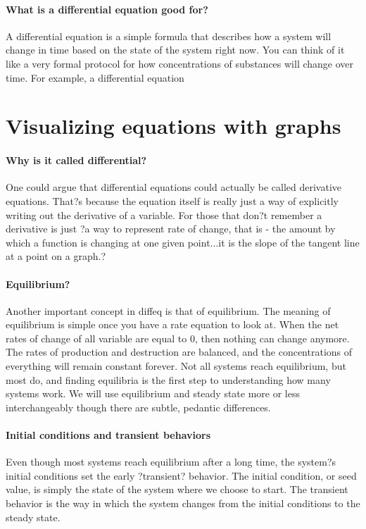 \paragraph{What is a differential equation good for?} A differential equation is a simple formula that describes how a system will change in time based on the state of the system right now. You can think of it like a very formal protocol for how concentrations of substances will change over time.  For example, a differential equation 





\section{Visualizing equations with graphs}
\paragraph{Why is it called differential?} One could argue that differential equations could actually be called derivative equations.  That?s because the equation itself is really just a way of explicitly writing out the derivative of a variable.  For those that don?t remember a derivative is just ?a way to represent rate of change, that is - the amount by which a function is changing at one given point...it is the slope of the tangent line at a point on a graph.?

\paragraph{Equilibrium?} Another important concept in diffeq is that of equilibrium.  The meaning of equilibrium is simple once you have a rate equation to look at.  When the net rates of change of all variable are equal to 0, then nothing can change anymore.  The rates of production and destruction are balanced, and the concentrations of everything will remain constant forever.  Not all systems reach equilibrium, but most do, and finding equilibria is the first step to understanding how many systems work.  We will use equilibrium and steady state more or less interchangeably though there are subtle, pedantic differences.

\paragraph{Initial conditions and transient behaviors} Even though most systems reach equilibrium after a long time, the system?s initial conditions set the early ?transient? behavior. The initial condition, or seed value, is simply the state of the system where we choose to start.  The transient behavior is the way in which the system changes from the initial conditions to the steady state.

